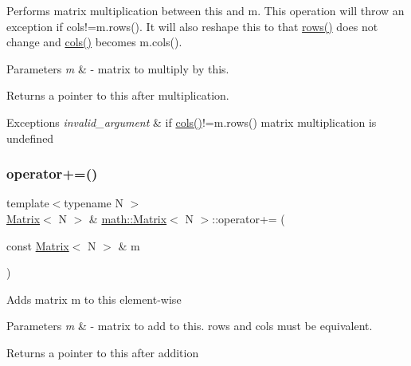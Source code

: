 Performs matrix multiplication between {\ttfamily this} and {\ttfamily m}. This operation will throw an exception if {\ttfamily cols!=m.\+rows()}. It will also reshape {\ttfamily this} to that {\ttfamily \hyperlink{classmath_1_1Matrix_a602173645d806afe305ed77b1ff38273}{rows()}} does not change and {\ttfamily \hyperlink{classmath_1_1Matrix_ad78b49e12a607856df124a18a855aaf1}{cols()}} becomes {\ttfamily m.\+cols()}. 
\begin{DoxyParams}{Parameters}
{\em m} & -\/ matrix to multiply by {\ttfamily this}. \\
\hline
\end{DoxyParams}
\begin{DoxyReturn}{Returns}
a pointer to {\ttfamily this} after multiplication. 
\end{DoxyReturn}

\begin{DoxyExceptions}{Exceptions}
{\em invalid\+\_\+argument} & if {\ttfamily \hyperlink{classmath_1_1Matrix_ad78b49e12a607856df124a18a855aaf1}{cols()}!=m.\+rows()} matrix multiplication is undefined \\
\hline
\end{DoxyExceptions}
\mbox{\label{classmath_1_1Matrix_ae2944c1e1a0f1958101db2197bcfaa3c}} 
\subsubsection{\texorpdfstring{operator+=()}{operator+=()}}
{\footnotesize\ttfamily template$<$typename N $>$ \\
\hyperlink{classmath_1_1Matrix}{Matrix}$<$ N $>$ \& \hyperlink{classmath_1_1Matrix}{math\+::\+Matrix}$<$ N $>$\+::operator+= (\begin{DoxyParamCaption}\item[{const \hyperlink{classmath_1_1Matrix}{Matrix}$<$ N $>$ \&}]{m }\end{DoxyParamCaption})}

Adds matrix {\ttfamily m} to {\ttfamily this} element-\/wise 
\begin{DoxyParams}{Parameters}
{\em m} & -\/ matrix to add to {\ttfamily this}. rows and cols must be equivalent. \\
\hline
\end{DoxyParams}
\begin{DoxyReturn}{Returns}
a pointer to {\ttfamily this} after addition 
\end{DoxyReturn}

